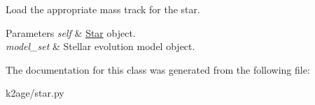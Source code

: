 \-Load the appropriate mass track for the star. 


\begin{DoxyParams}{\-Parameters}
{\em self} & \hyperlink{classk2age_1_1star_1_1Star}{\-Star} object. \\
\hline
{\em model\-\_\-set} & \-Stellar evolution model object. \\
\hline
\end{DoxyParams}


\-The documentation for this class was generated from the following file\-:\begin{DoxyCompactItemize}
\item 
k2age/star.\-py\end{DoxyCompactItemize}
